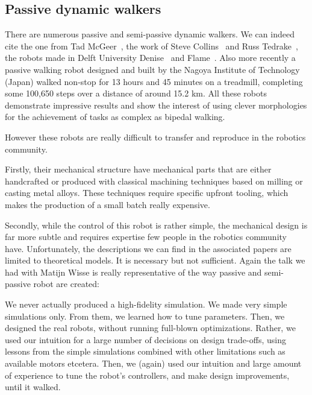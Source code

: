 

\subsection{Passive dynamic walkers} %

There are numerous passive and semi-passive dynamic walkers. We can indeed cite the one from Tad McGeer~\parencite{mcgeer1990passive}, the work of Steve Collins~\parencite{collins2001three} and Russ Tedrake~\parencite{tedrake2005learning}, the robots made in Delft University Denise~\parencite{wisse2005three} and Flame~\parencite{Hobbelen2008}. Also more recently a passive walking robot designed and built by the Nagoya Institute of Technology (Japan) walked non-stop for 13 hours and 45 minutes on a treadmill, completing some 100,650 steps over a distance of around 15.2 km. All these robots demonstrate impressive results and show the interest of using clever morphologies for the achievement of tasks as complex as bipedal walking.

However these robots are really difficult to transfer and reproduce in the robotics community.

Firstly, their mechanical structure have mechanical parts that are either handcrafted or produced with classical machining techniques based on milling or casting metal alloys. These techniques require specific upfront tooling, which makes the production of a small batch really expensive.

Secondly, while the control of this robot is rather simple, the mechanical design is far more subtle and requires expertise few people in the robotics community have. Unfortunately, the descriptions we can find in the associated papers are limited to theoretical models. It is necessary but not sufficient. Again the talk we had with Matijn Wisse is really representative of the way passive and semi-passive robot are created:

\begin{formal}
We never actually produced a high-fidelity simulation. We made very simple simulations only. From them, we learned how to tune parameters. Then, we designed the real robots, without running full-blown optimizations. Rather, we used our intuition for a large number of decisions on design trade-offs, using lessons from the simple simulations combined with other limitations such as available motors etcetera. Then, we (again) used our intuition and large amount of experience to tune the robot’s controllers, and make design improvements, until it walked.

\end{formal}

